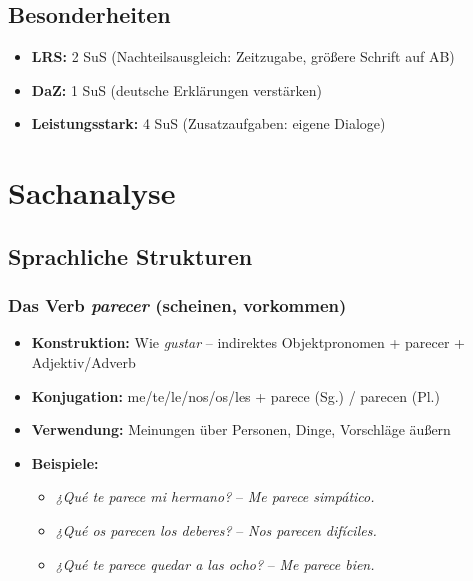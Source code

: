 \documentclass[11pt,a4paper]{article}
\begin{document}
\subsection{Besonderheiten}
\begin{itemize}
    \item \textbf{LRS:} 2 SuS (Nachteilsausgleich: Zeitzugabe, größere Schrift auf AB)
    \item \textbf{DaZ:} 1 SuS (deutsche Erklärungen verstärken)
    \item \textbf{Leistungsstark:} 4 SuS (Zusatzaufgaben: eigene Dialoge)
\end{itemize}

\section{Sachanalyse}

\subsection{Sprachliche Strukturen}

\subsubsection{Das Verb \textit{parecer} (scheinen, vorkommen)}
\begin{itemize}
    \item \textbf{Konstruktion:} Wie \textit{gustar} -- indirektes Objektpronomen + parecer + Adjektiv/Adverb
    \item \textbf{Konjugation:} me/te/le/nos/os/les + parece (Sg.) / parecen (Pl.)
    \item \textbf{Verwendung:} Meinungen über Personen, Dinge, Vorschläge äußern
    \item \textbf{Beispiele:}
    \begin{itemize}
        \item \textit{¿Qué te parece mi hermano?} -- \textit{Me parece simpático.}
        \item \textit{¿Qué os parecen los deberes?} -- \textit{Nos parecen difíciles.}
        \item \textit{¿Qué te parece quedar a las ocho?} -- \textit{Me parece bien.}
    \end{itemize}
\end{itemize}
\end{document}
